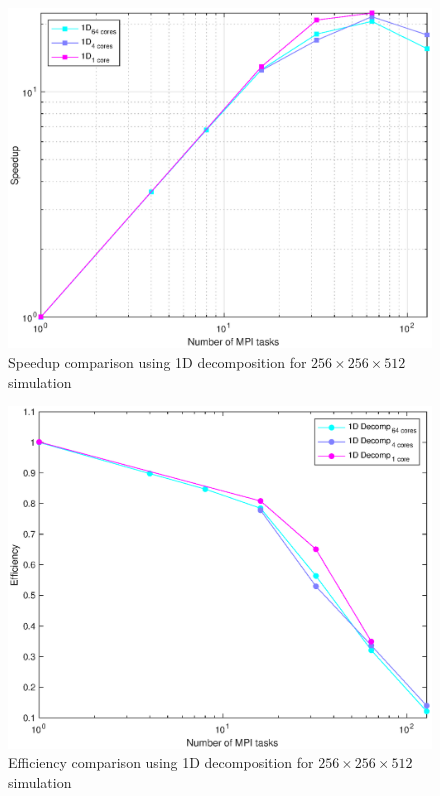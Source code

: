 \begin{figure}
\begin{center}
\includegraphics[scale=0.55]{grafici/1286}
\caption{Speedup comparison using 1D decomposition for $256\times 256\times 512$  simulation}
\label{1286}
\end{center}
\end{figure}
\begin{figure}
\begin{center}
\includegraphics[scale=0.55]{grafici/1288}
\caption{Efficiency comparison using 1D decomposition for $256\times 256\times 512$  simulation}
\label{1288}
\end{center}
\end{figure}
